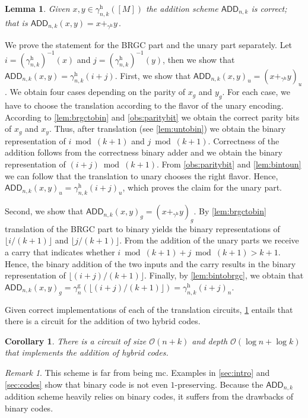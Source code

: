 \documentclass[9pt,journal,compsoc]{IEEEtran}
\newtheorem{corollary}[theorem]{Corollary}
\newtheorem{lemma}[theorem]{Lemma}
\theoremstyle{remark}
\newtheorem*{remark}{Remark}
\newcommand{\floor}[1]{\lfloor{#1}\rfloor}
\newcommand{\gBRGC}[1]{\gamma_{#1}^{\operatorname{g}}}
\newcommand{\gHyb}[1]{\gamma_{#1}^{\operatorname{h}}}
\newcommand{\BLM}{{\textsf{ADD}}_{n,k}}
\newcommand{\BO}{\mathcal{O}}
\begin{document}
\begin{lemma}\label{lem:stable_add}
  Given $x,y\in\gHyb{n,k}([M])$ the addition scheme $\BLM$ is correct;
  that is $\BLM(x,y) = x +_{\gHyb{}} y\,.$
\end{lemma}
\begin{IEEEproof}
  We prove the statement for the BRGC part and the unary part
    separately.
  Let $i = (\gHyb{n,k})^{-1}(x)$ and $j = (\gHyb{n,k})^{-1}(y)$,
    then we show that $\BLM(x,y)=\gHyb{n,k}(i+j)$.
  First, we show that $\BLM(x,y)_u = (x +_{\gHyb{}} y)_u$.
  We obtain four cases depending on the parity of $x_g$ and $y_g$.
  For each case, we have to choose the translation according to the
    flavor of the unary encoding.
  According to \cref{lem:brgctobin} and \cref{obs:paritybit}
    we obtain the correct parity bits of $x_g$ and $x_y$.
  Thus, after translation (see \cref{lem:untobin}) we obtain the
    binary representation of $i\bmod(k+1)$ and $j\bmod(k+1)$.
  Correctness of the addition follows from the correctness binary
    adder and we obtain the binary representation of $(i+j)\bmod(k+1)$.
  From \cref{obs:paritybit} and \cref{lem:bintoun} we can follow
    that the translation to unary chooses the right flavor.
  Hence, $\BLM(x,y)_u = \gHyb{n,k}(i+j)_u$, which proves the claim
    for the unary part.

  Second, we show that $\BLM(x,y)_g = (x +_{\gHyb{}} y)_g$.
  By \cref{lem:brgctobin} translation of the BRGC part to binary
    yields the binary representations of $\floor{i/(k+1)}$ and
    $\floor{j/(k+1)}$.
  From the addition of the unary parts we receive a carry that
    indicates whether $i\bmod(k+1) + j\bmod(k+1) > k+1$.
  Hence, the binary addition of the two inputs and the carry
    results in the binary representation of $\floor{(i+j)/(k+1)}$.
  Finally, by \cref{lem:bintobrgc}, we obtain that
  $\BLM(x,y)_g = \gBRGC{n}(\floor{(i+j)/(k+1)}) = \gHyb{n,k}(i+j)_n$.
\end{IEEEproof}

Given correct implementations of each of the translation circuits, \cref{lem:stable_add}
  entails that there is a circuit for the addition of two hybrid codes. 

\begin{corollary}
  There is a circuit of size $\BO(n+k)$ and depth $\BO(\log n + \log k)$ that implements
    the addition of hybrid codes.
\end{corollary}

\begin{remark}
  This scheme is far from being mc.
  Examples in \cref{sec:intro} and \cref{sec:codes} show that binary code is not even
    $1$-preserving.
  Because the $\BLM$ addition scheme heavily relies on binary codes,
    it suffers from the drawbacks of binary codes.
\end{remark}
\end{document}
